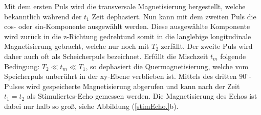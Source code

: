 Mit dem ersten Puls wird die transversale Magnetisierung hergestellt, welche bekanntlich w\"{a}hrend der $t_1$ Zeit dephasiert.
Nun kann mit dem zweiten Puls die cos- oder sin-Komponente ausgew\"{a}hlt werden.
Diese ausgew\"{a}hlte Komponente wird zur\"{u}ck in die z-Richtung gedrehtund somit in die langlebige longitudinale Magnetisierung gebracht, welche nur noch mit $T_2$ zerf\"{a}llt.
Der zweite Puls wird daher auch oft als Scheicherpuls bezeichnet.
Erf\"{u}llt die Mischzeit $t_m$ folgende Bedingung: $T_2 \ll t_m \ll T_1 $, so dephasiert die Quermagnetisierung, welche vom Speicherpuls unber\"{u}hrt in der xy-Ebene verblieben ist.
Mittels des dritten $90^{\circ}$-Pulses wird gespeicherte Magnetisierung abgerufen und kann nach der Zeit $t_1 = t_2$ als Stimuliertes-Echo gemessen werden.
Die Magnetisierung des Echos ist dabei nur halb so gro{\ss}, siehe Abbildung (\ref{stimEcho.}b).
